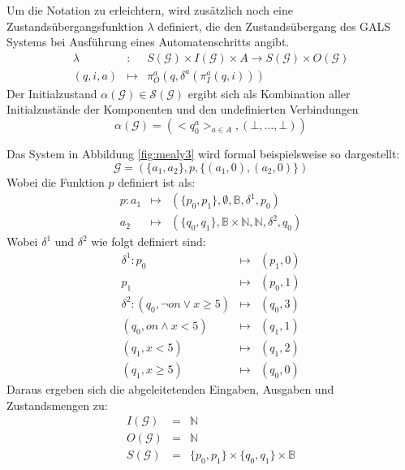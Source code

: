 Um die Notation zu erleichtern, wird zusätzlich noch eine Zustandsübergangsfunktion $\lambda$ definiert, die den Zustandsübergang des GALS Systems bei Ausführung eines Automatenschritts angibt.
\begin{eqnarray*}
  \lambda &:& S(\mathcal{G})\times I(\mathcal{G})\times A\rightarrow S(\mathcal{G})\times O(\mathcal{G})\\
  (q,i,a) &\mapsto& \pi_O^a(q,\delta^a(\pi_I^a(q,i)))
\end{eqnarray*}
Der Initialzustand $\alpha(\mathcal{G})\in\mathcal{S}(\mathcal{G})$ ergibt sich als Kombination aller Initialzustände der Komponenten und den undefinierten Verbindungen
\[ \alpha(\mathcal{G}) = (<q_0^a>_{a\in A},(\bot,\dots,\bot)) \]

Das System in Abbildung \ref{fig:mealy3} wird formal beispielsweise so dargestellt:
\[ \mathcal{G} = (\{a_1,a_2\},p,\{ (a_1,0),(a_2,0) \}) \]
Wobei die Funktion $p$ definiert ist als:
\begin{eqnarray*}
  p : a_1&\mapsto& (\{p_0,p_1\},\emptyset,\mathbb{B},\delta^1,p_0)\\
      a_2&\mapsto& (\{q_0,q_1\},\mathbb{B}\times\mathbb{N},\mathbb{N},\delta^2,q_0)
\end{eqnarray*}
Wobei $\delta^1$ und $\delta^2$ wie folgt definiert sind:
\begin{eqnarray*}
  \delta^1 : p_0 &\mapsto& (p_1,0)\\
             p_1 &\mapsto& (p_0,1)\\
  \delta^2 : (q_0,\lnot\mathit{on}\lor x\geq 5) &\mapsto& (q_0,3)\\
             (q_0,\mathit{on}\land x<5) &\mapsto& (q_1,1)\\
             (q_1,x<5) &\mapsto& (q_1,2)\\
             (q_1,x\geq 5) &\mapsto& (q_0,0)
\end{eqnarray*}
Daraus ergeben sich die abgeleitetenden Eingaben, Ausgaben und Zustandsmengen zu:
\begin{eqnarray*}
  I(\mathcal{G}) &=& \mathbb{N}\\
  O(\mathcal{G}) &=& \mathbb{N}\\
  S(\mathcal{G}) &=& \{p_0,p_1\}\times\{q_0,q_1\}\times\mathbb{B}
\end{eqnarray*}

